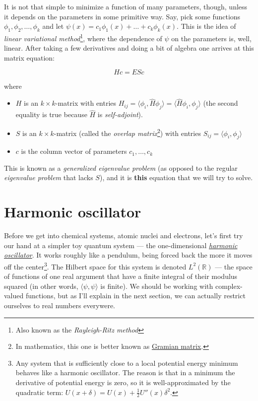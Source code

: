 \documentclass{article}
\begin{document}
It is not that simple to minimize a function of many parameters, though, unless it depends on the parameters in some primitive way. Say, pick some functions \(\phi_1, \phi_2, \dots, \phi_k\) and let \(\psi(x) = c_1 \phi_1(x) + \dots + c_k \phi_k(x) \). This is the idea of \textit{linear variational method}\footnote{Also known as the \textit{Rayleigh-Ritz method}}, where the dependence of \(\psi\) on the parameters is, well, linear. After taking a few derivatives and doing a bit of algebra one arrives\textsuperscript{\cite{ref:atkins}} at this matrix equation:

\begin{equation} \label{eq:var} H c = E S c \end{equation}

where

\begin{itemize}
\item \(H\) is an \(k\times k\)-matrix with entries \(H_{ij} = \langle \phi_i, \hat H \phi_j \rangle = \langle \hat H \phi_i, \phi_j \rangle\) (the second equality is true because \(\hat H\) is \textit{self-adjoint}).
\item \(S\) is an \(k\times k\)-matrix (called the \textit{overlap matrix}\footnote{In mathematics, this one is better known as \href{https://en.wikipedia.org/wiki/Gramian_matrix}{Gramian matrix}.}) with entries \(S_{ij} = \langle \phi_i, \phi_j \rangle\)
\item \(c\) is the column vector of parameters \(c_1, \dots, c_k\)
\end{itemize}

This is known as a \textit{generalized eigenvalue problem} (as opposed to the regular \textit{eigenvalue problem} that lacks \(S\)), and it is \textbf{this} equation that we will try to solve.

\section{Harmonic oscillator} \label{sec:harmonic}

Before we get into chemical systems, atomic nuclei and electrons, let's first try our hand at a simpler toy quantum system --- the one-dimensional \href{https://en.wikipedia.org/wiki/Quantum_harmonic_oscillator}{\textit{harmonic oscillator}}. It works roughly like a pendulum, being forced back the more it moves off the center\footnote{Any system that is sufficiently close to a local potential energy minimum behaves like a harmonic oscillator. The reason is that in a minimum the derivative of potential energy is zero, so it is well-approximated by the quadratic term: \(U(x+\delta)=U(x)+\frac{1}{2}U''(x)\delta^2\).}. The Hilbert space for this system is denoted \(L^2(\mathbb R)\) --- the space of functions of one real argument that have a finite integral of their modulus squared (in other words, \(\langle \psi, \psi \rangle\) is finite). We should be working with complex-valued functions, but as I'll explain in the next section, we can actually restrict ourselves to real numbers everywere.
\end{document}
